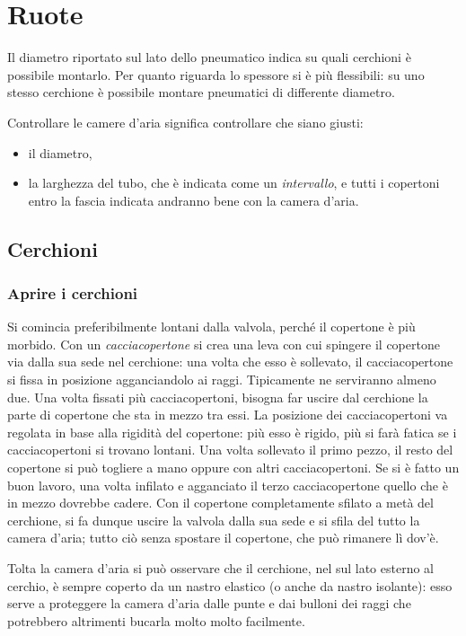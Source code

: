 \chapter{Ruote}
Il diametro riportato sul lato dello pneumatico indica su quali cerchioni è possibile montarlo.
Per quanto riguarda lo spessore si è più flessibili: su uno stesso cerchione è possibile montare pneumatici di differente diametro.

Controllare le camere d'aria significa controllare che siano giusti:
\begin{itemize}
  \item il diametro,
  \item la larghezza del tubo, che è indicata come un \emph{intervallo}, e tutti i copertoni entro la fascia indicata andranno bene con la camera d'aria.
\end{itemize}

\section*{Cerchioni}
\subsection*{Aprire i cerchioni}
Si comincia preferibilmente lontani dalla valvola, perché il copertone è più morbido.
Con un \emph{cacciacopertone} si crea una leva con cui spingere il copertone via dalla sua sede nel cerchione: una volta che esso è sollevato, il cacciacopertone si fissa in posizione agganciandolo ai raggi.
Tipicamente ne serviranno almeno due.
Una volta fissati più cacciacopertoni, bisogna far uscire dal cerchione la parte di copertone che sta in mezzo tra essi.
La posizione dei cacciacopertoni va regolata in base alla rigidità del copertone: più esso è rigido, più si farà fatica se i cacciacopertoni si trovano lontani.
Una volta sollevato il primo pezzo, il resto del copertone si può togliere a mano oppure con altri cacciacopertoni.
Se si è fatto un buon lavoro, una volta infilato e agganciato il terzo cacciacopertone quello che è in mezzo dovrebbe cadere.
Con il copertone completamente sfilato a metà del cerchione, si fa dunque uscire la valvola dalla sua sede e si sfila del tutto la camera d'aria; tutto ciò senza spostare il copertone, che può rimanere lì dov'è.

Tolta la camera d'aria si può osservare che il cerchione, nel sul lato esterno al cerchio, è sempre coperto da un nastro elastico (o anche da nastro isolante): esso serve a proteggere la camera d'aria dalle punte e dai bulloni dei raggi che potrebbero altrimenti bucarla molto molto facilmente.

